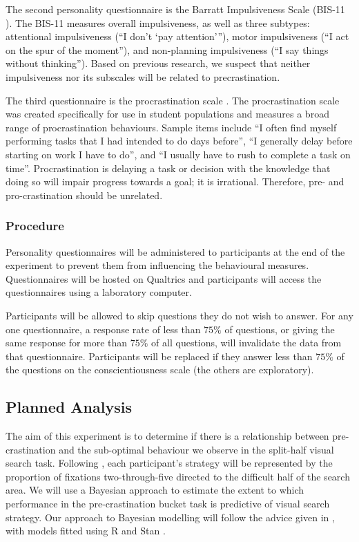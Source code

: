 \documentclass[]{rsos}
\begin{document}
The second personality questionnaire is the Barratt Impulsiveness Scale (BIS-11 \cite{patton1995}). The BIS-11 measures overall impulsiveness, as well as three subtypes: attentional impulsiveness (``I don't `pay attention'''), motor impulsiveness (``I act on the spur of the moment''), and non-planning impulsiveness (``I say things without thinking''). Based on previous research, we suspect that neither impulsiveness nor its subscales will be related to precrastination.

The third questionnaire is the procrastination scale \cite{lay1986}. The procrastination scale was created specifically for use in student populations and measures a broad range of procrastination behaviours. Sample items include ``I often find myself performing tasks that I had intended to do days before'', ``I generally delay before starting on work I have to do'', and ``I usually have to rush to complete a task on time''. Procrastination is delaying a task or decision with the knowledge that doing so will impair progress towards a goal; it is irrational. Therefore, pre- and pro-crastination should be unrelated.

\subsubsection{Procedure}

Personality questionnaires will be administered to participants at the end of the experiment to prevent them from influencing the behavioural measures. Questionnaires will be hosted on Qualtrics and participants will access the questionnaires using a laboratory computer.

Participants will be allowed to skip questions they do not wish to answer. For any one questionnaire, a response rate of less than $75\%$ of questions, or giving the same response for more than $75\%$ of all questions, will invalidate the data from that questionnaire. Participants will be replaced if they answer less than $75\%$ of the questions on the conscientiousness scale (the others are exploratory).

\subsection{Planned Analysis}

The aim of this experiment is to determine if there is a relationship between pre-crastination and the sub-optimal behaviour we observe in the split-half visual search task. Following \cite{nowakowska2017, clarke2019}, each participant's strategy will be represented by the proportion of fixations two-through-five directed to the difficult half of the search area. We will use a Bayesian approach to estimate the extent to which performance in the pre-crastination bucket task is predictive of visual search strategy. Our approach to Bayesian modelling will follow the advice given in \cite{mcelreath2016}, with models fitted using R \cite{r2019} and Stan \cite{carpenter2017stan}. 
\end{document}
